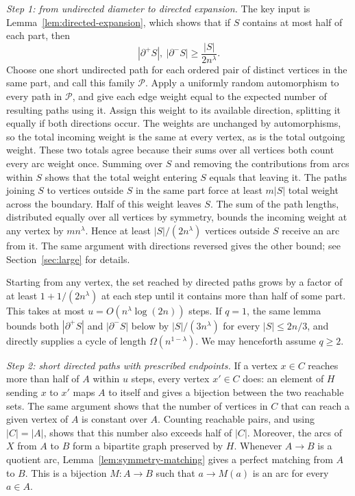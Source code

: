 \documentclass[11pt,a4paper,reqno]{amsart}
\theoremstyle{definition}
\theoremstyle{remark}
\numberwithin{equation}{section}
\begin{document}
\smallskip
\noindent\emph{Step 1: from undirected diameter to directed expansion.}
The key input is Lemma~\ref{lem:directed-expansion}, which shows that if $S$ contains at most half of each part, then
\[
 |\partial^+S|,\ |\partial^-S|\ge\frac{|S|}{2n^\lambda}.
\]
Choose one short undirected path for each ordered pair of distinct vertices in the same part, and call this family $\mathcal P$. Apply a uniformly random automorphism to every path in $\mathcal P$, and give each edge weight equal to the expected number of resulting paths using it. Assign this weight to its available direction, splitting it equally if both directions occur. The weights are unchanged by automorphisms, so the total incoming weight is the same at every vertex, as is the total outgoing weight. These two totals agree because their sums over all vertices both count every arc weight once. Summing over $S$ and removing the contributions from arcs within $S$ shows that the total weight entering $S$ equals that leaving it. The paths joining $S$ to vertices outside $S$ in the same part force at least $m|S|$ total weight across the boundary. Half of this weight leaves $S$. The sum of the path lengths, distributed equally over all vertices by symmetry, bounds the incoming weight at any vertex by $mn^\lambda$. Hence at least $|S|/(2n^\lambda)$ vertices outside $S$ receive an arc from it. The same argument with directions reversed gives the other bound; see Section~\ref{sec:large} for details.

Starting from any vertex, the set reached by directed paths grows by a factor of at least $1+1/(2n^\lambda)$ at each step until it contains more than half of some part. This takes at most $u=O(n^\lambda\log(2n))$ steps. If $q=1$, the same lemma bounds both $|\partial^+S|$ and $|\partial^-S|$ below by $|S|/(3n^\lambda)$ for every $|S|\le2n/3$, and~\cite[Lemma 2.4]{BHMSY} directly supplies a cycle of length $\Omega(n^{1-\lambda})$. We may henceforth assume $q\ge2$.

\smallskip
\noindent\emph{Step 2: short directed paths with prescribed endpoints.}
If a vertex $x\in C$ reaches more than half of $A$ within $u$ steps, every vertex $x'\in C$ does: an element of $H$ sending $x$ to $x'$ maps $A$ to itself and gives a bijection between the two reachable sets. The same argument shows that the number of vertices in $C$ that can reach a given vertex of $A$ is constant over $A$. Counting reachable pairs, and using $|C|=|A|$, shows that this number also exceeds half of $|C|$. Moreover, the arcs of $X$ from $A$ to $B$ form a bipartite graph preserved by $H$. Whenever $A\to B$ is a quotient arc, Lemma~\ref{lem:symmetry-matching} gives a perfect matching from $A$ to $B$. This is a bijection $M:A\to B$ such that $a\to M(a)$ is an arc for every $a\in A$.
\end{document}
